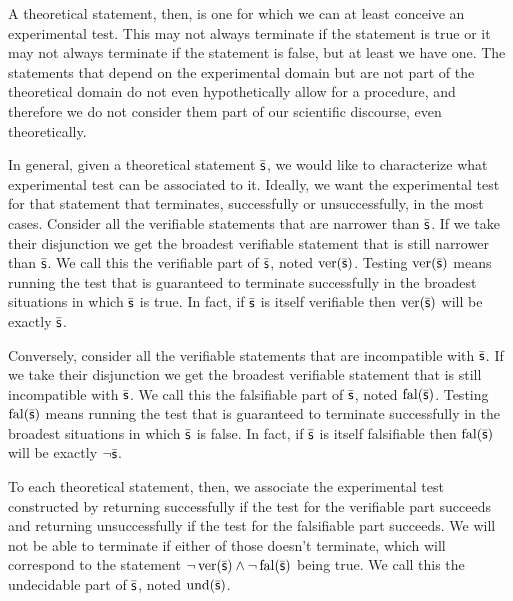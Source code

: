	A theoretical statement, then, is one for which we can at least conceive an experimental test. This may not always terminate if the statement is true or it may not always terminate if the statement is false, but at least we have one. The statements that depend on the experimental domain but are not part of the theoretical domain do not even hypothetically allow for a procedure, and therefore we do not consider them part of our scientific discourse, even theoretically.
	
	In general, given a theoretical statement $\bar{\mathsf{s}}$, we would like to characterize what experimental test can be associated to it. Ideally, we want the experimental test for that statement that terminates, successfully or unsuccessfully, in the most cases. Consider all the verifiable statements that are narrower than $\bar{\mathsf{s}}$. If we take their disjunction we get the broadest verifiable statement that is still narrower than $\bar{\mathsf{s}}$. We call this the verifiable part of $\bar{\mathsf{s}}$, noted $\operatorname{ver}(\bar{\mathsf{s}})$. Testing $\operatorname{ver}(\bar{\mathsf{s}})$ means running the test that is guaranteed to terminate successfully in the broadest situations in which $\bar{\mathsf{s}}$ is true. In fact, if $\bar{\mathsf{s}}$ is itself verifiable then $\operatorname{ver}(\bar{\mathsf{s}})$ will be exactly $\bar{\mathsf{s}}$.
	
	Conversely, consider all the verifiable statements that are incompatible with $\bar{\mathsf{s}}$. If we take their disjunction we get the broadest verifiable statement that is still incompatible with $\bar{\mathsf{s}}$. We call this the falsifiable part of $\bar{\mathsf{s}}$, noted $\operatorname{fal}(\bar{\mathsf{s}})$. Testing $\operatorname{fal}(\bar{\mathsf{s}})$ means running the test that is guaranteed to terminate successfully in the broadest situations in which $\bar{\mathsf{s}}$ is false. In fact, if $\bar{\mathsf{s}}$ is itself falsifiable then $\operatorname{fal}(\bar{\mathsf{s}})$ will be exactly $\neg\bar{\mathsf{s}}$.
	
	To each theoretical statement, then, we associate the experimental test constructed by returning successfully if the test for the verifiable part succeeds and returning unsuccessfully if the test for the falsifiable part succeeds. We will not be able to terminate if either of those doesn't terminate, which will correspond to the statement $\neg \operatorname{ver}(\bar{\mathsf{s}}) \wedge \neg \operatorname{fal}(\bar{\mathsf{s}})$ being true. We call this the undecidable part of $\bar{\mathsf{s}}$, noted $\operatorname{und}(\bar{\mathsf{s}})$.
	
